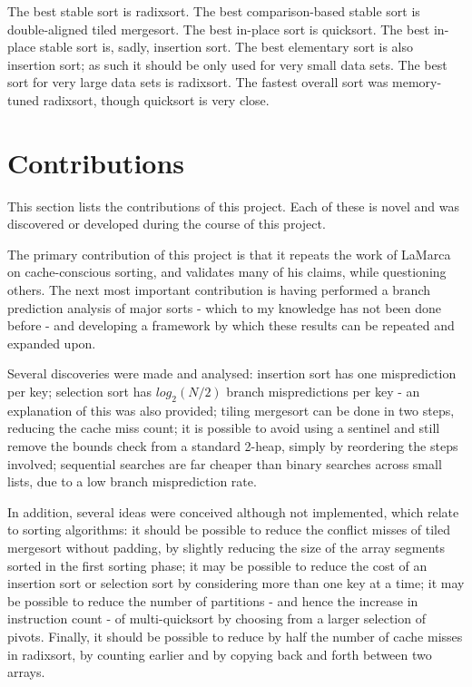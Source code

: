 The best stable sort is radixsort. The best comparison-based stable sort is
double-aligned tiled mergesort. The best in-place sort is quicksort. The best in-place
stable sort is, sadly, insertion sort. The best elementary sort is also
insertion sort; as such it should be only used for very small data sets.  The
best sort for very large data sets is radixsort. The fastest overall sort was
memory-tuned radixsort, though quicksort is very close.

\section{Contributions}

This section lists the contributions of this project. Each of these is novel  
and was discovered or developed during the course of this project.

The primary contribution of this project is that it repeats the work of LaMarca
on cache-conscious sorting, and validates many of his claims, while questioning
others. The next most important contribution is having performed a branch
prediction analysis of major sorts - which to my knowledge has not been done
before - and developing a framework by which these results can be repeated and
expanded upon.


Several discoveries were made and analysed: insertion sort has one misprediction
per key; selection sort has $log_2(N/2)$ branch mispredictions per key - an
explanation of this was also provided; tiling mergesort can be done in two
steps, reducing the cache miss count; it is possible to avoid using a
sentinel and still remove the bounds check from a standard 2-heap, simply by
reordering the steps involved; sequential searches are far cheaper than binary
searches across small lists, due to a low branch misprediction rate.



In addition, several ideas were conceived although not implemented, which relate
to sorting algorithms: it should be possible to reduce the conflict misses of
tiled mergesort without padding, by slightly reducing the size of the array
segments sorted in the first sorting phase; it may be possible to reduce the
cost of an insertion sort or selection sort by considering more than one key at
a time; it may be possible to reduce the number of partitions - and hence the
increase in instruction count - of multi-quicksort by choosing from a larger
selection of pivots. Finally, it should be possible to reduce by half the number
of cache misses in radixsort, by counting earlier and by copying back and forth
between two arrays.

